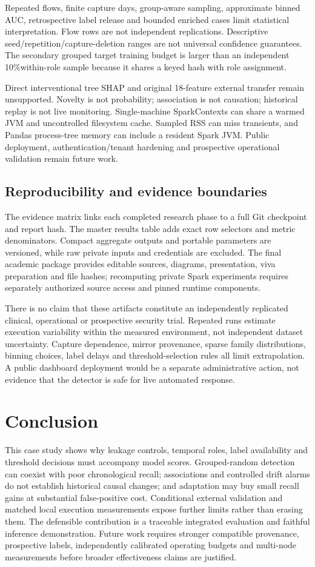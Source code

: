 \documentclass[conference]{IEEEtran}
\begin{document}
Repeated flows, finite capture days, group-aware sampling, approximate binned AUC, retrospective label release and bounded enriched cases limit statistical interpretation. Flow rows are not independent replications. Descriptive seed/repetition/capture-deletion ranges are not universal confidence guarantees. The secondary grouped target training budget is larger than an independent 10\%within-role sample because it shares a keyed hash with role assignment.

Direct interventional tree SHAP and original 18-feature external transfer remain unsupported. Novelty is not probability; association is not causation; historical replay is not live monitoring. Single-machine SparkContexts can share a warmed JVM and uncontrolled filesystem cache. Sampled RSS can miss transients, and Pandas process-tree memory can include a resident Spark JVM. Public deployment, authentication/tenant hardening and prospective operational validation remain future work.

\subsection{Reproducibility and evidence boundaries}
The evidence matrix links each completed research phase to a full Git checkpoint and report hash. The master results table adds exact row selectors and metric denominators. Compact aggregate outputs and portable parameters are versioned, while raw private inputs and credentials are excluded. The final academic package provides editable sources, diagrams, presentation, viva preparation and file hashes; recomputing private Spark experiments requires separately authorized source access and pinned runtime components.

There is no claim that these artifacts constitute an independently replicated clinical, operational or prospective security trial. Repeated runs estimate execution variability within the measured environment, not independent dataset uncertainty. Capture dependence, mirror provenance, sparse family distributions, binning choices, label delays and threshold-selection rules all limit extrapolation. A public dashboard deployment would be a separate administrative action, not evidence that the detector is safe for live automated response.

\section{Conclusion}
This case study shows why leakage controls, temporal roles, label availability and threshold decisions must accompany model scores. Grouped-random detection can coexist with poor chronological recall; associations and controlled drift alarms do not establish historical causal changes; and adaptation may buy small recall gains at substantial false-positive cost. Conditional external validation and matched local execution measurements expose further limits rather than erasing them. The defensible contribution is a traceable integrated evaluation and faithful inference demonstration. Future work requires stronger compatible provenance, prospective labels, independently calibrated operating budgets and multi-node measurements before broader effectiveness claims are justified.

\end{document}
